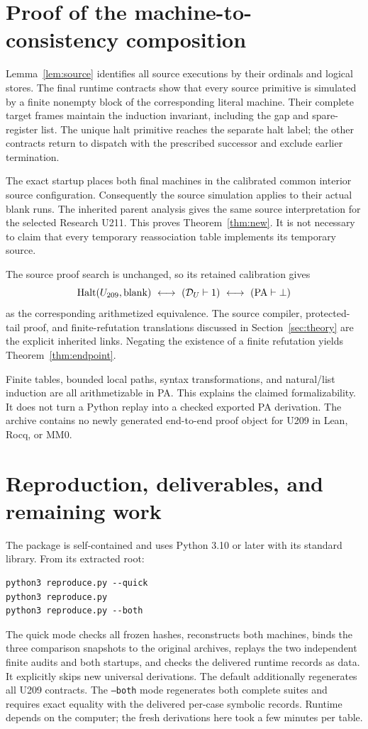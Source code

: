 \section{Proof of the machine-to-consistency composition}
Lemma~\ref{lem:source} identifies all source executions by their ordinals and
logical stores. The final runtime contracts show that every source primitive
is simulated by a finite nonempty block of the corresponding literal machine.
Their complete target frames maintain the induction invariant, including the
gap and spare-register list. The unique halt primitive reaches the separate
halt label; the other contracts return to dispatch with the prescribed
successor and exclude earlier termination.

The exact startup places both final machines in the calibrated common
interior source configuration. Consequently the source simulation applies
to their actual blank runs. The inherited parent analysis gives the same
source interpretation for the selected Research U211. This proves
Theorem~\ref{thm:new}. It is not necessary to claim that every temporary
reassociation table implements its temporary source.

The source proof search is unchanged, so its retained calibration gives
\[
 \operatorname{Halt}(U_{209},\mathrm{blank})
 \ \longleftrightarrow\ (\mathcal D_U\vdash1)
 \ \longleftrightarrow\ (\mathrm{PA}\vdash\bot)
\]
as the corresponding arithmetized equivalence. The source compiler,
protected-tail proof, and finite-refutation translations discussed in
Section~\ref{sec:theory} are the explicit inherited links.
Negating the existence of a finite refutation yields
Theorem~\ref{thm:endpoint}.

Finite tables, bounded local paths, syntax transformations, and natural/list
induction are all arithmetizable in PA. This explains the claimed
formalizability. It does not turn a Python replay into a checked exported
PA derivation. The archive contains no newly generated end-to-end proof object
for U209 in Lean, Rocq, or MM0.

\section{Reproduction, deliverables, and remaining work}
The package is self-contained and uses Python 3.10 or later with its standard
library. From its extracted root:
\begin{verbatim}
python3 reproduce.py --quick
python3 reproduce.py
python3 reproduce.py --both
\end{verbatim}
The quick mode checks all frozen hashes, reconstructs both machines, binds
the three comparison snapshots to the original archives, replays the two
independent finite audits and both startups, and checks the delivered runtime
records as data. It explicitly skips new universal derivations.
The default additionally regenerates all U209 contracts.
The \texttt{--both} mode regenerates both complete suites and requires exact
equality with the delivered per-case symbolic records. Runtime depends on
the computer; the fresh derivations here took a few minutes per table.


